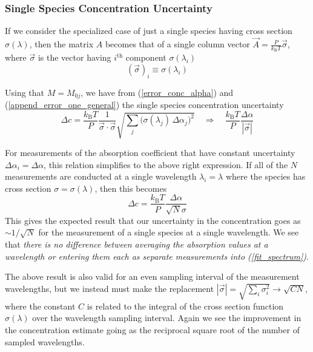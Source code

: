 \documentclass[12pt]{report}
\begin{document}
	\subsubsection{Single Species Concentration Uncertainty}
	If we consider the specialized case of just a single species having cross section $\sigma(\lambda)$, then the matrix $A$ becomes that of a single column vector $\vec{A} = \frac{P}{k_\mathrm{B} T} \vec{\sigma}$, where $\vec{\sigma}$ is the vector having $i^\mathrm{th}$ component $\sigma(\lambda_i)$
	\begin{equation}
		\left(\vec{\sigma}\right)_i \equiv \sigma(\lambda_i)
	\end{equation}
	
	Using that $M=M_{0j}$, we have from (\ref{error_conc_alpha}) and (\ref{append_error_one_general}) the single species concentration uncertainty
	\begin{equation}\label{error_one_general}
		\Delta c = \frac{k_\mathrm{B}T}{P}\frac{1}{\vec{\sigma}\cdot\vec{\sigma}} \sqrt{\sum_j \Big(\sigma(\lambda_j) \, \Delta\alpha_j\Big)^2}
		\quad\Rightarrow\quad
		\frac{k_\mathrm{B}T}{P}\frac{\Delta \alpha}{\left|\vec{\sigma}\right|}
	\end{equation}
	
	For measurements of the absorption coefficient that have constant uncertainty $\Delta \alpha_i = \Delta \alpha$, this relation simplifies to the above right expression. If all of the $N$ measurements are conducted at a single wavelength $\lambda_i = \lambda$ where the species has cross section $\sigma = \sigma(\lambda)$, then this becomes
	\begin{equation}
		\Delta c = \frac{k_\mathrm{B} T}{P} \frac{\Delta \alpha}{\sqrt{N} \sigma}
	\end{equation}
	This gives the expected result that our uncertainty in the concentration goes as $\sim 1/\sqrt{N}$ for the measurement of a single species at a single wavelength. We see that \textit{there is no difference between averaging the absorption values at a wavelength or entering them each as separate measurements into (\ref{fit_spectrum})}.
	
	The above result is also valid for an even sampling interval of the measurement wavelengths, but we instead must make the replacement $\left|\vec{\sigma}\right| = \sqrt{\sum_i \sigma_i^2} \rightarrow \sqrt{C N}$, where the constant $C$ is related to the integral of the cross section function $\sigma(\lambda)$ over the wavelength sampling interval. Again we see the improvement in the concentration estimate going as the reciprocal square root of the number of sampled wavelengths.
	
\end{document}
